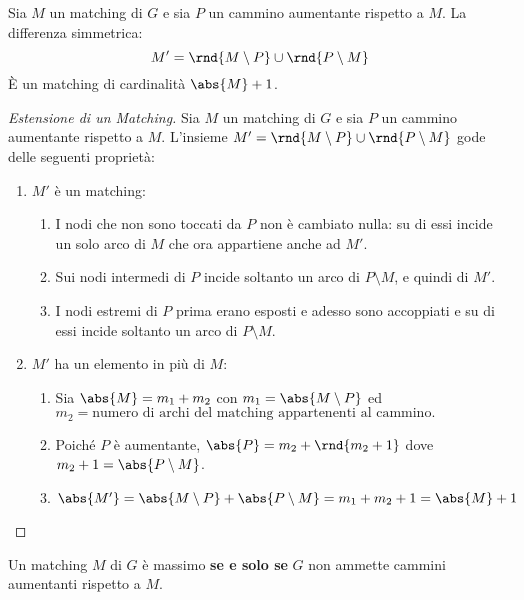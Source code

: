 \documentclass[\main/main.tex]{subfiles}
\begin{document}
\begin{theorem}
	Sia \(M\) un matching di \(G\) e sia \(P\) un cammino aumentante rispetto a \(M\). La differenza simmetrica:
	\[
		M' = \rnd{M\setminus P} \cup \rnd{P\setminus M}
	\]
	È un matching di cardinalità \(\abs{M} + 1\).
\end{theorem}

\begin{proof}[Estensione di un Matching]
	Sia \(M\) un matching di \(G\) e sia \(P\) un cammino aumentante rispetto a \(M\). L'insieme \(M' = \rnd{M\setminus P} \cup \rnd{P\setminus M}\) gode delle seguenti proprietà:
	\begin{enumerate}
		\item \(M'\) è un matching:
		      \begin{enumerate}
			      \item I nodi che non sono toccati da \(P\) non è cambiato nulla: su di essi incide un solo arco di \(M\) che ora appartiene anche ad \(M'\).
			      \item Sui nodi intermedi di \(P\) incide soltanto un arco di \(P\setminus M\), e quindi di \(M'\).
			      \item I nodi estremi di \(P\) prima erano esposti e adesso sono accoppiati e su di essi incide soltanto un arco di \(P\setminus M\).
		      \end{enumerate}
		\item \(M'\) ha un elemento in più di \(M\):
		      \begin{enumerate}
			      \item Sia \(\abs{M} = m_1 + m_2\) con \(m_1 = \abs{M \setminus P}\) ed \(m_2 = \text{numero di archi del matching appartenenti al cammino.}\)
			      \item Poiché \(P\) è aumentante, \(\abs{P} = m_2 + \rnd{m_2 + 1}\) dove \(m_2 + 1 = \abs{P\setminus M}\).
			      \item \(\abs{M'} = \abs{M \setminus P} + \abs{P \setminus M} = m_1 + m_2 + 1 = \abs{M} +1\)
		      \end{enumerate}
	\end{enumerate}
\end{proof}
\clearpage
\begin{theorem}
	Un matching \(M\) di \(G\) è massimo \textbf{se e solo se} \(G\) non ammette cammini aumentanti rispetto a \(M\).
\end{theorem}
\end{document}
